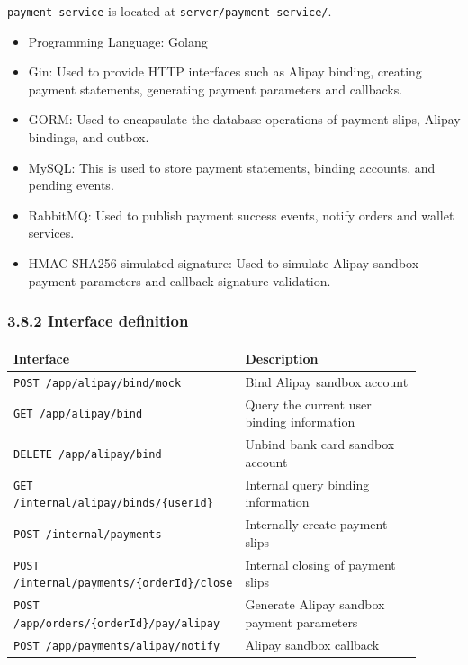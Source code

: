 \documentclass{article}
\begin{document}
\texttt{payment-service} is located at \texttt{server/payment-service/}.

\begin{itemize}
    \item Programming Language: Golang
    \item Gin: Used to provide HTTP interfaces such as Alipay binding, creating payment statements, generating payment parameters and callbacks.
    \item GORM: Used to encapsulate the database operations of payment slips, Alipay bindings, and outbox.
    \item MySQL: This is used to store payment statements, binding accounts, and pending events.
    \item RabbitMQ: Used to publish payment success events, notify orders and wallet services.
    \item HMAC-SHA256 simulated signature: Used to simulate Alipay sandbox payment parameters and callback signature validation.
\end{itemize}

\subsubsection{3.8.2 Interface definition}

\begin{longtable}{p{0.45\linewidth}p{0.45\linewidth}}
\toprule
\textbf{Interface} & \textbf{Description} \\
\midrule
\texttt{POST /app/alipay/bind/mock} & Bind Alipay sandbox account \\
\texttt{GET /app/alipay/bind} & Query the current user binding information \\
\texttt{DELETE /app/alipay/bind} & Unbind bank card sandbox account \\
\texttt{GET /internal/alipay/binds/\{userId\}} & Internal query binding information \\
\texttt{POST /internal/payments} & Internally create payment slips \\
\texttt{POST /internal/payments/\{orderId\}/close} & Internal closing of payment slips \\
\texttt{POST /app/orders/\{orderId\}/pay/alipay} & Generate Alipay sandbox payment parameters \\
\texttt{POST /app/payments/alipay/notify} & Alipay sandbox callback \\
\bottomrule
\end{longtable}
\end{document}
